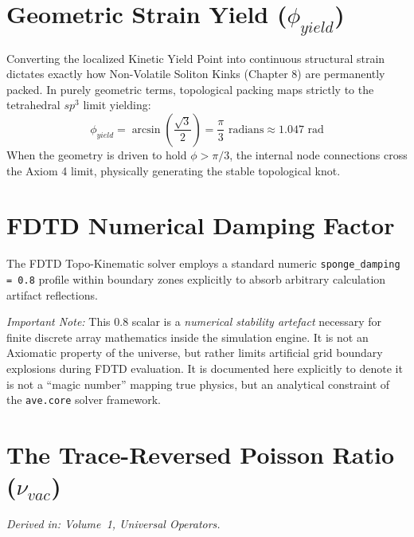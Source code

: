 \section{Geometric Strain Yield ($\phi_{yield}$)}

Converting the localized Kinetic Yield Point into continuous structural strain dictates exactly how Non-Volatile Soliton Kinks (Chapter 8) are permanently packed.
In purely geometric terms, topological packing maps strictly to the tetrahedral $sp^3$ limit yielding:
\begin{equation}
    \phi_{yield} = \arcsin\left(\frac{\sqrt{3}}{2}\right) = \frac{\pi}{3} \text{ radians} \approx 1.047 \text{ rad}
\end{equation}
When the geometry is driven to hold $\phi > \pi/3$, the internal node connections cross the Axiom 4 limit, physically generating the stable topological knot.

\section{FDTD Numerical Damping Factor}

The FDTD Topo-Kinematic solver employs a standard numeric \texttt{sponge\_damping = 0.8} profile within boundary zones explicitly to absorb arbitrary calculation artifact reflections. 

\textit{Important Note:} This $0.8$ scalar is a \emph{numerical stability artefact} necessary for finite discrete array mathematics inside the simulation engine. It is not an Axiomatic property of the universe, but rather limits artificial grid boundary explosions during FDTD evaluation. It is documented here explicitly to denote it is not a ``magic number'' mapping true physics, but an analytical constraint of the \texttt{ave.core} solver framework.

\section{The Trace-Reversed Poisson Ratio ($\nu_{vac}$)}
\label{app:trace_reversed_poisson}
\textit{Derived in: Volume~1, Universal Operators.}

